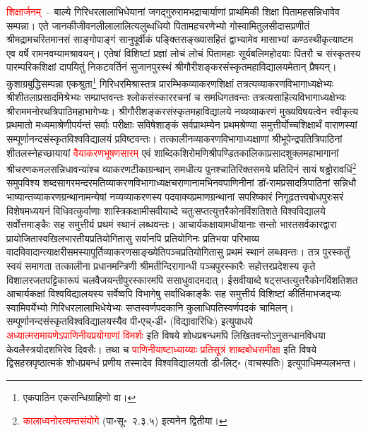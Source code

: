 \begin{sloppypar}\justifying\noindent\hspace{10mm} \textcolor{red}{शिक्षार्जनम्}~– बाल्ये गिरिधर\-लालाभिधेयानां जगद्गुरु\-रामभद्राचार्याणां प्राथमिकी शिक्षा पितामह\-सन्निधावेव सम्पन्ना। एते जानकी\-जीवन\-लीला\-लालित्य\-लुब्ध\-धियो पितामह\-चरणेभ्यो गोस्वामि\-तुलसीदास\-प्रणीतं श्रीमद्रामचरितमानसं साङ्गोपाङ्गं सानुपूर्वीकं पङ्क्तिसङ्ख्यासहितं द्वाभ्यामेव मासाभ्यां कण्ठस्थीकृत्याष्टम एव वर्षे रामनवम्यामश्रावयन्। एतेषां विशिष्टां प्रज्ञां लोचं लोचं पितामहाः सूर्यबलि\-महोदयाः पितरौ च संस्कृतस्य पारम्परिक\-शिक्षां दापयितुं निकटवर्तिनं सुजानपुरस्थं श्रीगौरीशङ्कर\-संस्कृत\-महाविद्यालयमेतान् प्रैषयन्। कुशाग्र\-बुद्धि\-सम्पन्ना एकश्रुता\footnote{एकपाठिन एकसन्धिग्राहिणो वा।} गिरिधरमिश्रास्तत्र प्रारम्भिक\-व्याकरण\-शिक्षां तत्रत्य\-व्याकरण\-विभागाध्यक्षेभ्यः श्रीशीतला\-प्रसाद\-मिश्रेभ्यः सम्प्राप्तवन्तः श्लोक\-संस्कार\-रचनां च समधिगतवन्तः तत्रत्य\-साहित्य\-विभागाध्यक्षेभ्यः श्रीराम\-मनोरथ\-त्रिपाठि\-महाभागेभ्यः। श्रीगौरीशङ्कर\-संस्कृत\-महाविद्यालये नव्यव्याकरणं मुख्यविषयत्वेन स्वीकृत्य प्रथमातो मध्यमाश्रेणी\-पर्यन्तं सर्वाः परीक्षाः सविषेशाङ्कं सर्वप्राथम्येन प्रथम\-श्रेण्या समुत्तीर्योच्च\-शिक्षार्थं वाराणस्यां सम्पूर्णानन्द\-संस्कृत\-विश्वविद्यालयं प्रविष्टवन्तः। तत्कालीन\-व्याकरण\-विभागाध्यक्षाणां श्रीभूपेन्द्र\-पति\-त्रिपाठिनां शीतल\-स्नेह\-च्छायायां \textcolor{red}{वैयाकरण\-भूषण\-सारम्} एवं शाब्दिक\-शिरोमणि\-श्रीपण्डित\-कालिका\-प्रसाद\-शुक्ल\-महाभागानां श्रीचरण\-कमल\-सन्निधावन्यांश्च व्याकरण\-टीका\-ग्रन्थान् समधीत्य पुनश्चातिरिक्तसमये प्रतिदिनं सायं षड्ढोरावधिं\footnote{\textcolor{red}{कालाध्वनोरत्यन्त\-संयोगे} (पा॰सू॰~२.३.५) इत्यनेन द्वितीया।} समुपविश्य शब्द\-सागर\-मन्दर\-मति\-व्याकरण\-विभागाध्यक्ष\-चराणानामभिनव\-पाणिनीनां डॉ॰\-रामप्रसाद\-त्रिपाठिनां सन्निधौ भाष्यान्त\-व्याकरण\-ग्रन्थानामन्येषां नव्यव्याकरणस्य पद\-वाक्य\-प्रमाण\-ग्रन्थानां सपरिष्कारं निगूढ\-तत्त्व\-बोध\-पुरःसरं विशेषमध्ययनं विधिवत्कुर्वाणाः शास्त्रिकक्षामीसवीयाब्दे चतुःसप्तत्युत्तरैकोन\-विंशतिशते विश्वविद्यालये सर्वोत्तमाङ्कैः सह समुत्तीर्य प्रथमं स्थानं लब्धवन्तः। आचार्यकक्षायामधीयानाः सन्तो भारत\-सर्वकार\-द्वारा प्रायोजितास्वखिल\-भारतीय\-प्रतियोगितासु सर्वानपि प्रतियोगिनः प्रतिभया परिभाव्य वाद\-विवादान्त्याक्षरी\-समस्यापूर्ति\-व्याकरण\-साङ्ख्येति\-पञ्च\-प्रतियोगितासु प्रथमं स्थानं लब्धवन्तः। तत्र पुरस्कर्तुं स्वयं समागता तत्कालीना प्रधान\-मन्त्रिणी श्रीमतीन्दिरागान्धी पञ्चपुरस्कारैः सहोत्तरप्रदेशस्य कृते विशाल\-रजत\-पट्टिका\-रूपं चलवैजयन्ती\-पुरस्कारमपि ससाधुवादमदात्। ईसवीयाब्दे षट्सप्तत्युत्तरैकोन\-विंशतिशत आचार्य\-कक्षां विश्वविद्यालयस्य सर्वेष्वपि विभागेषु सर्वाधिकाङ्कैः सह समुत्तीर्य विशिष्टां कीर्तिमाभजद्भ्यः स्वामि\-वर्येभ्यो गिरिधर\-लालाभिधेयेभ्यः सप्तस्वर्ण\-पदकानि कुलाधिपति\-स्वर्ण\-पदकं चामिलन्। सम्पूर्णानन्द\-संस्कृत\-विश्वविद्यालयस्यैव पी॰एच्॰डी॰ (विद्यावारिधिः) इत्युपाधये \textcolor{red}{अध्यात्म\-रामायणेऽपाणिनीय\-प्रयोगाणां विमर्शः} इति विषये शोध\-प्रबन्धमपि लिखित\-वन्तोऽनुसन्धान\-विधया केवलैस्त्रयोदशभिरेव दिवसैः। तथा च \textcolor{red}{पाणिनीयाष्टाध्याय्याः प्रतिसूत्रं शाब्दबोधसमीक्षा} इति विषये द्विसहस्रपृष्ठात्मकं शोधप्रबन्धं प्रणीय तस्मादेव विश्वविद्यालयतो डी॰लिट्॰ (वाचस्पतिः) इत्युपाधिमप्यलभन्त।\end{sloppypar}
